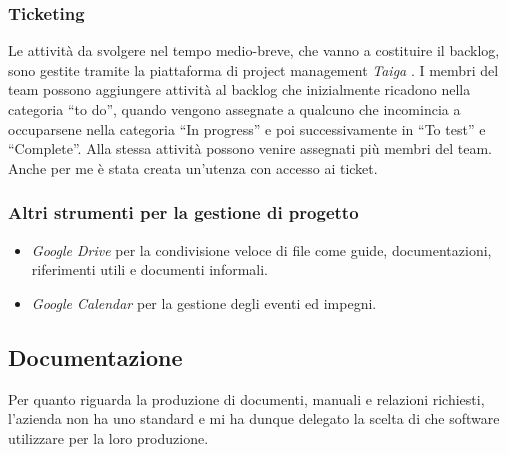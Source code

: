         \subsubsection{Ticketing}
        Le attività da svolgere nel tempo medio-breve, che vanno a costituire il backlog, sono gestite tramite la piattaforma di project management \textit{Taiga} \cite{site:taiga}. I membri del team possono aggiungere attività al backlog che inizialmente ricadono nella categoria ``to do'', quando vengono assegnate a qualcuno che incomincia a occuparsene nella categoria ``In progress'' e poi successivamente in ``To test'' e ``Complete''. Alla stessa attività possono venire assegnati più membri del team.
        Anche per me è stata creata un'utenza con accesso ai ticket.
                
        \subsubsection{Altri strumenti per la gestione di progetto}
        \begin{itemize}
            \item \textit{Google Drive} \cite{site:drive} per la condivisione veloce di file come guide, documentazioni, riferimenti utili e documenti informali.
            \item \textit{Google Calendar} \cite{site:calendar} per la gestione degli eventi ed impegni.
        \end{itemize}
    
    \subsection{Documentazione}
        Per quanto riguarda la produzione di documenti, manuali e relazioni richiesti, l'azienda non ha uno standard e mi ha dunque delegato la scelta di che software utilizzare per la loro produzione. 
